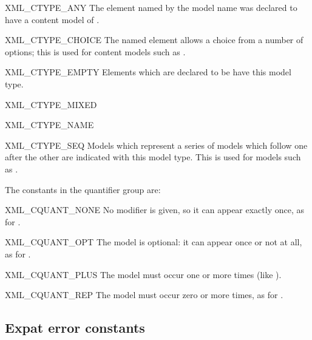 \begin{datadescni}{XML_CTYPE_ANY}
The element named by the model name was declared to have a content
model of .
\end{datadescni}

\begin{datadescni}{XML_CTYPE_CHOICE}
The named element allows a choice from a number of options; this is
used for content models such as .
\end{datadescni}

\begin{datadescni}{XML_CTYPE_EMPTY}
Elements which are declared to be  have this model type.
\end{datadescni}

\begin{datadescni}{XML_CTYPE_MIXED}
\end{datadescni}

\begin{datadescni}{XML_CTYPE_NAME}
\end{datadescni}

\begin{datadescni}{XML_CTYPE_SEQ}
Models which represent a series of models which follow one after the
other are indicated with this model type.  This is used for models
such as .
\end{datadescni}


The constants in the quantifier group are:

\begin{datadescni}{XML_CQUANT_NONE}
No modifier is given, so it can appear exactly once, as for .
\end{datadescni}

\begin{datadescni}{XML_CQUANT_OPT}
The model is optional: it can appear once or not at all, as for
.
\end{datadescni}

\begin{datadescni}{XML_CQUANT_PLUS}
The model must occur one or more times (like ).
\end{datadescni}

\begin{datadescni}{XML_CQUANT_REP}
The model must occur zero or more times, as for .
\end{datadescni}


\subsection{Expat error constants \label{expat-errors}}

